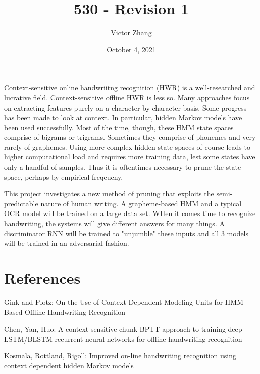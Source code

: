 \documentclass{article}
\title{530 - Revision 1}
\author{Victor Zhang}
\date{October 4, 2021}
\begin{document}
\maketitle

\section{}
Context-sensitive online handwriitng recognition (HWR) is a well-researched and lucrative field. Context-sensitive offline HWR is less so. Many approaches focus on extracting features purely on a character by character basis. Some progress has been made to look at context. In particular, hidden Markov models have been used successfully. Most of the time, though, these HMM state spaces comprise of bigrams or trigrams. Sometimes they comprise of phonemes and very rarely of graphemes. Using more complex hidden state spaces of course leads to higher computational load and requires more training data, lest some states have only a handful of samples. Thus it is oftentimes necessary to prune the state space, perhaps by empirical freqeucny.

This project investigates a new method of pruning that exploits the semi-predictable nature of human writing. A grapheme-based HMM and a typical OCR model will be trained on a large data set. WHen it comes time to recognize handwriting, the systems will give different answers for many things. A discriminator RNN will be trained to "unjumble" these inputs and all 3 models will be trained in an adversarial fashion.

\section{References}
Gink and Plotz: On the Use of Context-Dependent Modeling Units for HMM-Based Offline Handwriting Recognition

Chen, Yan, Huo: A context-sensitive-chunk BPTT approach to training deep LSTM/BLSTM recurrent neural networks for offline handwriting recognition

Kosmala, Rottland, Rigoll: Improved on-line handwriting recognition using context dependent hidden Markov models
\end{document}
